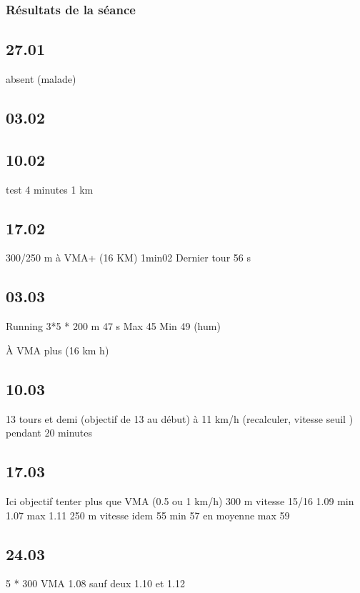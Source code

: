 \documentclass{article}%
\begin{document}
    \subsubsection{Résultats de la séance}
    
    \subsection{27.01}
        absent (malade)
    
    \subsection{03.02}
    
    
    \subsection{10.02}
        test 4 minutes 1 km
    
    
    \subsection{17.02}
        300/250 m à VMA+ (16 KM)
        1min02
        Dernier tour 56 s
    
    
    \subsection{03.03}
        Running 3*5 * 200 m
        47 s
        Max 45 
        Min 49 (hum)
        
        À VMA plus (16 km h)
        
        
    \subsection{10.03}
        13 tours et demi (objectif de 13 au début)
        à 11 km/h (recalculer, vitesse seuil ) pendant 20 minutes
    
    
    \subsection{17.03}
        Ici objectif tenter plus que VMA (0.5 ou 1 km/h)
        300 m vitesse 15/16
        1.09 min 1.07 max 1.11
        250 m vitesse idem
        55 min 57 en moyenne max 59
        
        
    \subsection{24.03}
        5 * 300 VMA
        1.08 sauf deux 1.10 et 1.12
        
\end{document}
